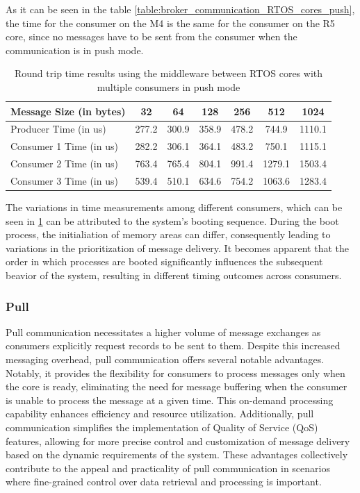 As it can be seen in the table \ref{table:broker_communication_RTOS_cores_push},
the time for the consumer on the M4 is the same for the consumer on the R5 core,
since no messages have to be sent from the consumer when the communication is
in push mode.

\begin{table}[H]
\centering
\caption{Round trip time results using the middleware between RTOS cores with
         multiple consumers in push mode}
\label{table:broker_communication_RTOS_cores_multiple_consumers_push}
\begin{tabular}{lcccccc}
\toprule
Message Size (in bytes) & 32 & 64 & 128 & 256 & 512 & 1024 \\
\midrule
Producer Time (in us) & 277.2 & 300.9 & 358.9 & 478.2 & 744.9 & 1110.1 \\
Consumer 1 Time (in us) & 282.2 & 306.1 & 364.1 & 483.2 & 750.1 & 1115.1 \\
Consumer 2 Time (in us) & 763.4 & 765.4 & 804.1 & 991.4 & 1279.1 & 1503.4 \\
Consumer 3 Time (in us) & 539.4 & 510.1 & 634.6 & 754.2 & 1063.6 & 1283.4 \\
\bottomrule
\end{tabular}
\end{table}

The variations in time measurements among different consumers, which can be
seen in \ref{table:broker_communication_RTOS_cores_multiple_consumers_push}
can be attributed to the system's booting sequence.
During the boot process, the initialiation of memory areas can differ,
consequently leading to variations in the prioritization of message delivery.
It becomes apparent that the order in which processes are booted significantly
influences the subsequent beavior of the system, resulting in different timing
outcomes across consumers.

\subsubsection{Pull}

Pull communication necessitates a higher volume of message exchanges as
consumers explicitly request records to be sent to them.
Despite this increased messaging overhead, pull communication offers several
notable advantages. Notably, it provides the flexibility for consumers to
process messages only when the core is ready, eliminating the need for message
buffering when the consumer is unable to process the message at a given time.
This on-demand processing capability enhances efficiency and resource
utilization. Additionally, pull communication simplifies the implementation
of Quality of Service (QoS) features, allowing for more precise control and
customization of message delivery based on the dynamic requirements of the
system. These advantages collectively contribute to the appeal and practicality
of pull communication in scenarios where fine-grained control over data
retrieval and processing is important. 

